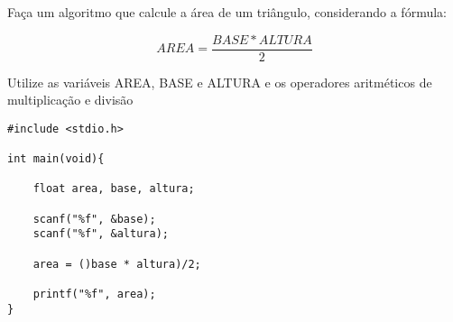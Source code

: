 
Faça um algoritmo que calcule a área de um triângulo, considerando a fórmula:

\begin{equation}
	AREA = \frac{BASE*ALTURA}{2}
\end{equation}

Utilize as variáveis AREA, BASE e ALTURA e os operadores aritméticos de multiplicação e divisão

\begin{solution}
\begin{lstlisting}
#include <stdio.h>

int main(void){

	float area, base, altura;
	
	scanf("%f", &base);
	scanf("%f", &altura);
	
	area = ()base * altura)/2;
	
	printf("%f", area);
}
\end{lstlisting}
\end{solution}


